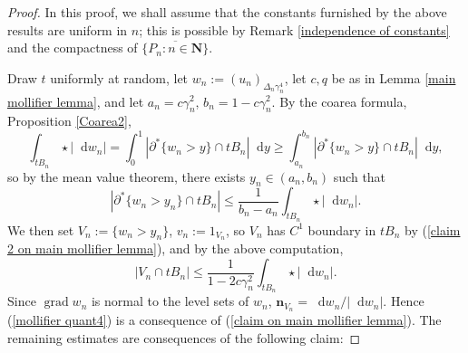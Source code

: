 \documentclass[reqno,10pt]{amsart}
\newcommand{\NN}{\mathbf{N}}
\newcommand*\dif{\mathop{}\!\mathrm{d}}
\DeclareMathOperator{\grad}{grad}
\newcommand{\normal}{\mathbf n}
\theoremstyle{definition}
\numberwithin{equation}{section}
\begin{document}
\begin{proof}
In this proof, we shall assume that the constants furnished by the above results are uniform in $n$; this is possible by Remark \ref{independence of constants} and the compactness of $\overline{\{P_n: n \in \NN\}}$.

Draw $t$ uniformly at random, let $w_n := (u_n)_{\Delta_n \gamma_n^4}$, let $c, q$ be as in Lemma \ref{main mollifier lemma}, and let $a_n = c\gamma_n^2$, $b_n = 1 - c\gamma_n^2$.
By the coarea formula, Proposition \ref{Coarea2},
$$\int_{tB_n} \star |\dif w_n| = \int_0^1 |\partial^* \{w_n > y\} \cap tB_n| \dif y \geq \int_{a_n}^{b_n} |\partial^* \{w_n > y\} \cap tB_n| \dif y,$$
so by the mean value theorem, there exists $y_n \in (a_n, b_n)$ such that
$$|\partial^* \{w_n > y_n\} \cap tB_n| \leq \frac{1}{b_n - a_n} \int_{tB_n} \star |\dif w_n|.$$
We then set $V_n := \{w_n > y_n\}$, $v_n := 1_{V_n}$, so $V_n$ has $C^1$ boundary in $tB_n$ by (\ref{claim 2 on main mollifier lemma}), and by the above computation,
\begin{equation}\label{MVT mollifier}
|V_n \cap tB_n| \leq \frac{1}{1 - 2c\gamma_n^2} \int_{tB_n} \star |\dif w_n|.
\end{equation}
Since $\grad w_n$ is normal to the level sets of $w_n$, $\normal_{V_n} = \dif w_n/|\dif w_n|$.
Hence (\ref{mollifier quant4}) is a consequence of (\ref{claim on main mollifier lemma}).
The remaining estimates are consequences of the following claim:


\end{proof}
\end{document}
